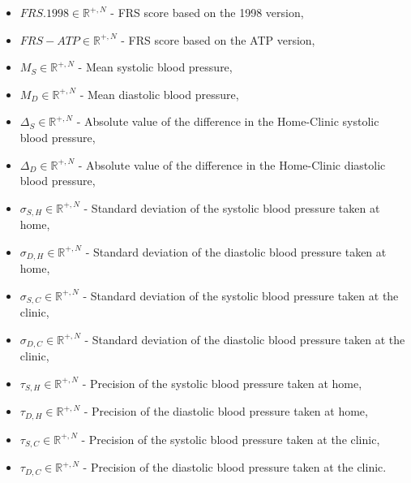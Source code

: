 \documentclass[
]{article}
\providecommand{\tightlist}{%
  \setlength{\itemsep}{0pt}\setlength{\parskip}{0pt}}
\begin{document}
\begin{itemize}
\tightlist
\item
  \(FRS.1998\in\mathbb{R}^{+,N}\) - FRS score based on the 1998 version,
\item
  \(FRS-ATP\in\mathbb{R}^{+,N}\) - FRS score based on the ATP version,
\item
  \(M_S\in\mathbb{R}^{+,N}\) - Mean systolic blood pressure,
\item
  \(M_D\in\mathbb{R}^{+,N}\) - Mean diastolic blood pressure,
\item
  \(\Delta_S\in\mathbb{R}^{+,N}\) - Absolute value of the difference in
  the Home-Clinic systolic blood pressure,
\item
  \(\Delta_D\in\mathbb{R}^{+,N}\) - Absolute value of the difference in
  the Home-Clinic diastolic blood pressure,
\item
  \(\sigma_{S,H}\in\mathbb{R}^{+,N}\) - Standard deviation of the
  systolic blood pressure taken at home,
\item
  \(\sigma_{D,H}\in\mathbb{R}^{+,N}\) - Standard deviation of the
  diastolic blood pressure taken at home,
\item
  \(\sigma_{S,C}\in\mathbb{R}^{+,N}\) - Standard deviation of the
  systolic blood pressure taken at the clinic,
\item
  \(\sigma_{D,C}\in\mathbb{R}^{+,N}\) - Standard deviation of the
  diastolic blood pressure taken at the clinic,
\item
  \(\tau_{S,H}\in\mathbb{R}^{+,N}\) - Precision of the systolic blood
  pressure taken at home,
\item
  \(\tau_{D,H}\in\mathbb{R}^{+,N}\) - Precision of the diastolic blood
  pressure taken at home,
\item
  \(\tau_{S,C}\in\mathbb{R}^{+,N}\) - Precision of the systolic blood
  pressure taken at the clinic,
\item
  \(\tau_{D,C}\in\mathbb{R}^{+,N}\) - Precision of the diastolic blood
  pressure taken at the clinic.
\end{itemize}
\end{document}
